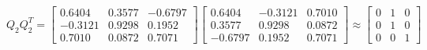 \documentclass[12pt]{article}
\begin{document}
\\~\\$Q_2Q_2^T=\left[\begin{matrix} 0.6404 & 0.3577 & -0.6797 \\ -0.3121 & 0.9298 & 0.1952 \\ 0.7010 & 0.0872 & 0.7071 \end{matrix}\right]\left[\begin{matrix} 0.6404 & -0.3121 & 0.7010 \\ 0.3577 & 0.9298 & 0.0872 \\ -0.6797 & 0.1952 & 0.7071 \end{matrix}\right]\approx \left[\begin{matrix} 0 & 1 & 0 \\ 0 & 1 & 0 \\ 0 & 0 & 1 \end{matrix}\right]$

\newpage
\end{document}
